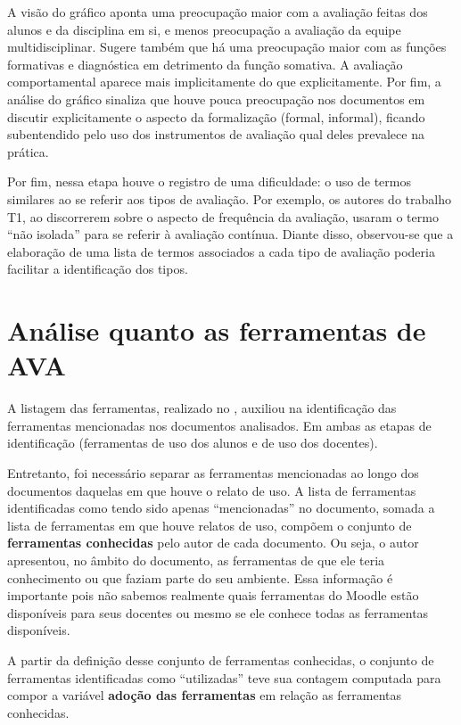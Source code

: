 A visão do gráfico aponta uma preocupação maior com a avaliação feitas dos alunos e da disciplina em si, e menos preocupação a avaliação da equipe multidisciplinar. Sugere também que há uma preocupação maior com as funções formativas e diagnóstica em detrimento da função somativa. A avaliação comportamental aparece mais implicitamente do que explicitamente. Por fim, a análise do gráfico sinaliza que houve pouca preocupação nos documentos em discutir explicitamente o aspecto da formalização (formal, informal), ficando subentendido pelo uso dos instrumentos de avaliação qual deles prevalece na prática.

Por fim, nessa etapa houve o registro de uma dificuldade: o uso de termos similares ao se referir aos tipos de avaliação. Por exemplo, os autores do trabalho T1, ao discorrerem sobre o aspecto de frequência da avaliação, usaram o termo ``não isolada'' para se referir à avaliação contínua. Diante disso, observou-se que a elaboração de uma lista de termos associados a cada tipo de avaliação poderia facilitar a identificação dos tipos.

\section{Análise quanto as ferramentas de AVA}%
A listagem das ferramentas, realizado no , auxiliou na identificação das ferramentas mencionadas nos documentos analisados. Em ambas as etapas de identificação (ferramentas de uso dos alunos e de uso dos docentes).

Entretanto, foi necessário separar as ferramentas mencionadas ao longo dos documentos daquelas em que houve o relato de uso. A lista de ferramentas identificadas como tendo sido apenas ``mencionadas'' no documento, somada a lista de ferramentas em que houve relatos de uso, compõem o conjunto de \textbf{ferramentas conhecidas} pelo autor de cada documento. Ou seja, o autor apresentou, no âmbito do documento, as ferramentas de que ele teria conhecimento ou que faziam parte do seu ambiente. Essa informação é importante pois não sabemos realmente quais ferramentas do Moodle estão disponíveis para seus docentes ou mesmo se ele conhece todas as ferramentas disponíveis.

A partir da definição desse conjunto de ferramentas conhecidas, o conjunto de ferramentas identificadas como ``utilizadas'' teve sua contagem computada para compor a variável \textbf{adoção das ferramentas} em relação as ferramentas conhecidas. 

